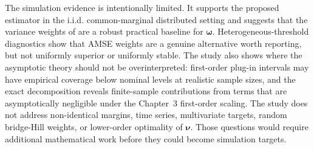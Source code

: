 The simulation evidence is intentionally limited. It supports the proposed
estimator in the i.i.d. common-marginal distributed setting and suggests that
the variance weights of \textcite{DaouiaPadoanStupfler2021} are a robust
practical baseline for \(\bm\omega\). Heterogeneous-threshold diagnostics show
that AMSE weights are a
genuine alternative worth reporting, but not uniformly superior or uniformly
stable.
The study also shows where the asymptotic theory should not be
overinterpreted: first-order plug-in intervals may have empirical coverage below
nominal levels at realistic
sample sizes, and the exact decomposition reveals finite-sample contributions
from terms that are asymptotically negligible under the Chapter~3
first-order scaling.
The study does not address non-identical margins, time series, multivariate
targets, random bridge-Hill weights, or lower-order optimality of
\(\bm\nu\). Those questions would require additional mathematical work before
they could become simulation targets.

\begin{table}[htbp]
\centering
\small
\caption{Pooled-Weissman weight diagnostics in the representative main design.}
\label{tab:sim:weights}
\begingroup
\setlength{\tabcolsep}{4pt}

\endgroup
\end{table}

\begin{table}[htbp]
\centering
\small
\caption{Pooled-Weissman weight comparison under heterogeneous local threshold
fractions. The bridge-Hill weights are fixed at
\(\bm\nu=\bm\nu_n^k\).}
\label{tab:sim:omega-heterogeneous}
\begingroup
\setlength{\tabcolsep}{2pt}

\endgroup
\end{table}
